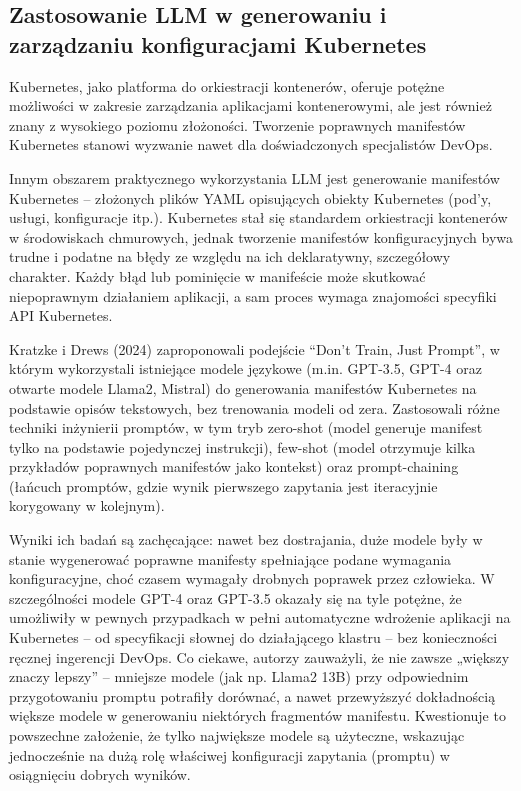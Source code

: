 \subsection{Zastosowanie LLM w generowaniu i zarządzaniu konfiguracjami Kubernetes}

Kubernetes, jako platforma do orkiestracji kontenerów, oferuje potężne możliwości w zakresie zarządzania aplikacjami kontenerowymi, ale jest również znany z wysokiego poziomu złożoności. Tworzenie poprawnych manifestów Kubernetes stanowi wyzwanie nawet dla doświadczonych specjalistów DevOps.

Innym obszarem praktycznego wykorzystania LLM jest generowanie manifestów Kubernetes – złożonych plików YAML opisujących obiekty Kubernetes (pod’y, usługi, konfiguracje itp.). Kubernetes stał się standardem orkiestracji kontenerów w środowiskach chmurowych, jednak tworzenie manifestów konfiguracyjnych bywa trudne i podatne na błędy ze względu na ich deklaratywny, szczegółowy charakter. Każdy błąd lub pominięcie w manifeście może skutkować niepoprawnym działaniem aplikacji, a sam proces wymaga znajomości specyfiki API Kubernetes.

Kratzke i Drews (2024) zaproponowali podejście “Don’t Train, Just Prompt”, w którym wykorzystali istniejące modele językowe (m.in. GPT-3.5, GPT-4 oraz otwarte modele Llama2, Mistral) do generowania manifestów Kubernetes na podstawie opisów tekstowych, bez trenowania modeli od zera. Zastosowali różne techniki inżynierii promptów, w tym tryb zero-shot (model generuje manifest tylko na podstawie pojedynczej instrukcji), few-shot (model otrzymuje kilka przykładów poprawnych manifestów jako kontekst) oraz prompt-chaining (łańcuch promptów, gdzie wynik pierwszego zapytania jest iteracyjnie korygowany w kolejnym).

Wyniki ich badań są zachęcające: nawet bez dostrajania, duże modele były w stanie wygenerować poprawne manifesty spełniające podane wymagania konfiguracyjne, choć czasem wymagały drobnych poprawek przez człowieka. W szczególności modele GPT-4 oraz GPT-3.5 okazały się na tyle potężne, że umożliwiły w pewnych przypadkach w pełni automatyczne wdrożenie aplikacji na Kubernetes – od specyfikacji słownej do działającego klastru – bez konieczności ręcznej ingerencji DevOps. Co ciekawe, autorzy zauważyli, że nie zawsze „większy znaczy lepszy” – mniejsze modele (jak np. Llama2 13B) przy odpowiednim przygotowaniu promptu potrafiły dorównać, a nawet przewyższyć dokładnością większe modele w generowaniu niektórych fragmentów manifestu. Kwestionuje to powszechne założenie, że tylko największe modele są użyteczne, wskazując jednocześnie na dużą rolę właściwej konfiguracji zapytania (promptu) w osiągnięciu dobrych wyników.


